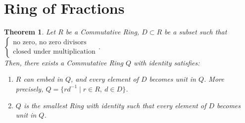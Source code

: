 \documentclass[8pt]{report}
\theoremstyle{romanstyle}
\newtheorem{theorem}{Theorem}
\begin{document}
\section{Ring of Fractions}
\begin{theorem}
    Let $R$ be a Commutative Ring, $D \subset R$ be a subset such that $\begin{cases}
        \text{no zero, no zero divisors} \\ \text{closed under multiplication}
    \end{cases}$. \\
    Then, there exists a Commutative Ring $Q$ with identity satisfies:
    \begin{enumerate}
        \item $R$ can embed in $Q$, and every element of $D$ becomes unit in $Q$.
        More precisely, $Q = \{r d^{-1} \mid r \in R,\ d \in D\}$.
        \item $Q$ is the smallest Ring with identity such that every element of $D$ becomes unit in $Q$.
    \end{enumerate}
\end{theorem}
\end{document}
